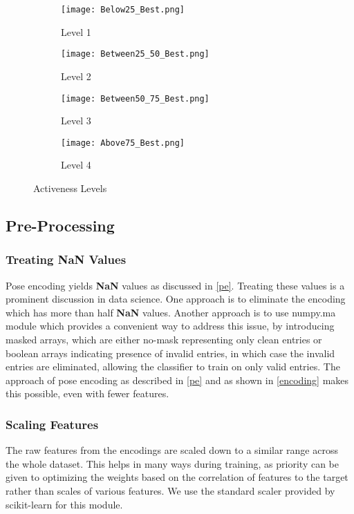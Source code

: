 \documentclass[sigconf]{acmart}
\begin{document}
\begin{figure*}[ht]
 \begin{subfigure}{.21\textwidth}
  \texttt{[image: Below25\_Best.png]}
  \caption{Level 1}
  \label{75}
 \end{subfigure}
 \begin{subfigure}{.21\textwidth}
  \texttt{[image: Between25\_50\_Best.png]}
  \caption{Level 2}
  \label{50_75}
 \end{subfigure}
 \begin{subfigure}{.21\textwidth}
  \texttt{[image: Between50\_75\_Best.png]}
  \caption{Level 3}
  \label{25_50}
 \end{subfigure}
 \begin{subfigure}{.21\textwidth}
  \texttt{[image: Above75\_Best.png]}
  \caption{Level 4}
  \label{25}
 \end{subfigure}
\vspace{-0.25cm}
\caption{Activeness Levels}
\label{levels}
\end{figure*}

\subsection{Pre-Processing}\label{pp}
\subsubsection{Treating \textbf{NaN} Values}
Pose encoding yields \textbf{NaN} values as discussed in \autoref{pe}. Treating these values is a prominent discussion in data science. One approach is to eliminate the encoding which has more than half \textbf{NaN} values. Another approach is to use numpy.ma module \cite{group} which provides a convenient way to address this issue, by introducing masked arrays, which are either no-mask representing only clean entries or boolean arrays indicating presence of invalid entries, in which case the invalid entries are eliminated, allowing the classifier to train on only valid entries. The approach of pose encoding as described in \autoref{pe} and as shown in \autoref{encoding} makes this possible, even with fewer features.

\subsubsection{Scaling Features}
The raw features from the encodings are scaled down to a similar range across the whole dataset. This helps in many ways during training, as priority can be given to optimizing the weights based on the correlation of features to the target rather than scales of various features. We use the standard scaler provided by scikit-learn for this module.
\end{document}
